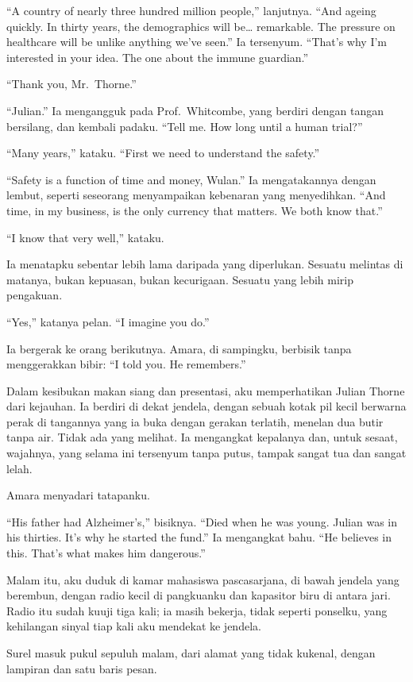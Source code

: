\documentclass[11pt,twoside,openany]{book}
\makeatletter
\newcommand{\scenebreak}{\par\vspace{0.9em}{\centering\textsc{*\hspace{0.7em}*\hspace{0.7em}*}\par}\vspace{0.9em}\@afterindentfalse\@afterheading}
\makeatother
\begin{document}
``A country of nearly three hundred million people,'' lanjutnya. ``And ageing quickly. In thirty years, the demographics will be\ldots{} remarkable. The pressure on healthcare will be unlike anything we've seen.'' Ia tersenyum. ``That's why I'm interested in your idea. The one about the immune guardian.''

``Thank you, Mr.~Thorne.''

``Julian.'' Ia mengangguk pada Prof.~Whitcombe, yang berdiri dengan tangan bersilang, dan kembali padaku. ``Tell me. How long until a human trial?''

``Many years,'' kataku. ``First we need to understand the safety.''

``Safety is a function of time and money, Wulan.'' Ia mengatakannya dengan lembut, seperti seseorang menyampaikan kebenaran yang menyedihkan. ``And time, in my business, is the only currency that matters. We both know that.''

``I know that very well,'' kataku.

Ia menatapku sebentar lebih lama daripada yang diperlukan. Sesuatu melintas di matanya, bukan kepuasan, bukan kecurigaan. Sesuatu yang lebih mirip pengakuan.

``Yes,'' katanya pelan. ``I imagine you do.''

Ia bergerak ke orang berikutnya. Amara, di sampingku, berbisik tanpa menggerakkan bibir: ``I told you. He remembers.''

Dalam kesibukan makan siang dan presentasi, aku memperhatikan Julian Thorne dari kejauhan. Ia berdiri di dekat jendela, dengan sebuah kotak pil kecil berwarna perak di tangannya yang ia buka dengan gerakan terlatih, menelan dua butir tanpa air. Tidak ada yang melihat. Ia mengangkat kepalanya dan, untuk sesaat, wajahnya, yang selama ini tersenyum tanpa putus, tampak sangat tua dan sangat lelah.

Amara menyadari tatapanku.

``His father had Alzheimer's,'' bisiknya. ``Died when he was young. Julian was in his thirties. It's why he started the fund.'' Ia mengangkat bahu. ``He believes in this. That's what makes him dangerous.''

\scenebreak
Malam itu, aku duduk di kamar mahasiswa pascasarjana, di bawah jendela yang berembun, dengan radio kecil di pangkuanku dan kapasitor biru di antara jari. Radio itu sudah kuuji tiga kali; ia masih bekerja, tidak seperti ponselku, yang kehilangan sinyal tiap kali aku mendekat ke jendela.

Surel masuk pukul sepuluh malam, dari alamat yang tidak kukenal, dengan lampiran dan satu baris pesan.
\end{document}
